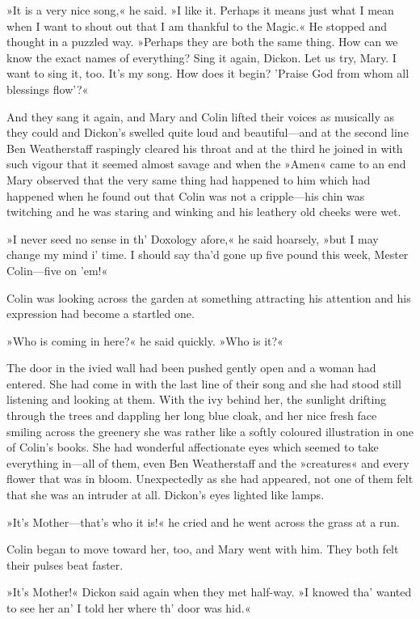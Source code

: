 »It is a very nice song,« he said. »I like it. Perhaps it means just what I mean when I want to shout out that I am thankful to the Magic.« He stopped and thought in a puzzled way. »Perhaps they are both the same thing. How can we know the exact names of everything? Sing it again, Dickon. Let us try, Mary. I want to sing it, too. It's my song. How does it begin? 'Praise God from whom all blessings flow'?«

And they sang it again, and Mary and Colin lifted their voices as musically as they could and Dickon's swelled quite loud and beautiful—and at the second line Ben Weatherstaff raspingly cleared his throat and at the third he joined in with such vigour that it seemed almost savage and when the »Amen« came to an end Mary observed that the very same thing had happened to him which had happened when he found out that Colin was not a cripple—his chin was twitching and he was staring and winking and his leathery old cheeks were wet.

»I never seed no sense in th' Doxology afore,« he said hoarsely, »but I may change my mind i' time. I should say tha'd gone up five pound this week, Mester Colin—five on 'em!«

Colin was looking across the garden at something attracting his attention and his expression had become a startled one.

»Who is coming in here?« he said quickly. »Who is it?«

The door in the ivied wall had been pushed gently open and a woman had entered. She had come in with the last line of their song and she had stood still listening and looking at them. With the ivy behind her, the sunlight drifting through the trees and dappling her long blue cloak, and her nice fresh face smiling across the greenery she was rather like a softly coloured illustration in one of Colin's books. She had wonderful affectionate eyes which seemed to take everything in—all of them, even Ben Weatherstaff and the »creatures« and every flower that was in bloom. Unexpectedly as she had appeared, not one of them felt that she was an intruder at all. Dickon's eyes lighted like lamps.

»It's Mother—that's who it is!« he cried and he went across the grass at a run.

Colin began to move toward her, too, and Mary went with him. They both felt their pulses beat faster.

»It's Mother!« Dickon said again when they met half-way. »I knowed tha' wanted to see her an' I told her where th' door was hid.«

